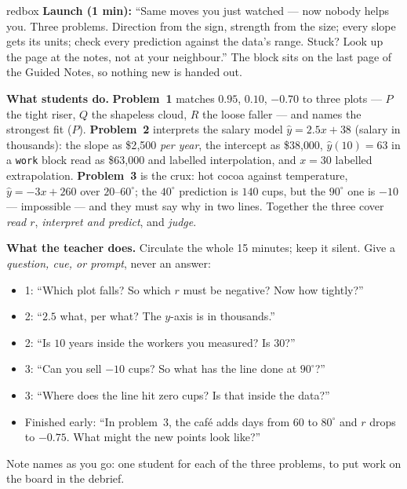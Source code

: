\documentclass[10pt]{article}
\begin{document}
\begin{skillbox}{redbox}
\textbf{Launch (1 min):} ``Same moves you just watched --- now nobody helps you. Three problems.
Direction from the sign, strength from the size; every slope gets its units; check every
prediction against the data's range. Stuck? Look up the page at the notes, not at your
neighbour.'' The block sits on the last page of the Guided Notes, so nothing new is handed out.
\begin{multicols}{2}
\textbf{What students do.} \textbf{Problem~1} matches $0.95$, $0.10$, $-0.70$ to three plots ---
$P$ the tight riser, $Q$ the shapeless cloud, $R$ the loose faller --- and names the strongest
fit ($P$). \textbf{Problem~2} interprets the salary model $\hat y=2.5x+38$ (salary in thousands):
the slope as \$2{,}500 \emph{per year}, the intercept as \$38{,}000, $\hat y(10)=63$ in a
\texttt{work} block read as \$63{,}000 and labelled interpolation, and $x=30$ labelled
extrapolation. \textbf{Problem~3} is the crux: hot cocoa against temperature,
$\hat y=-3x+260$ over $20$--$60^\circ$; the $40^\circ$ prediction is $140$ cups, but the
$90^\circ$ one is $-10$ --- impossible --- and they must say why in two lines. Together the three
cover \emph{read $r$}, \emph{interpret and predict}, and \emph{judge}.

\columnbreak
\textbf{What the teacher does.} Circulate the whole 15 minutes; keep it silent. Give a
\emph{question, cue, or prompt}, never an answer:
\begin{itemize}[leftmargin=1.1em, nosep]
  \item 1: ``Which plot falls? So which $r$ must be negative? Now how tightly?''
  \item 2: ``$2.5$ what, per what? The $y$-axis is in thousands.''
  \item 2: ``Is $10$ years inside the workers you measured? Is $30$?''
  \item 3: ``Can you sell $-10$ cups? So what has the line done at $90^\circ$?''
  \item 3: ``Where does the line hit zero cups? Is that inside the data?''
  \item Finished early: ``In problem~3, the caf\'e adds days from $60$ to $80^\circ$ and $r$
        drops to $-0.75$. What might the new points look like?''
\end{itemize}
Note names as you go: one student for each of the three problems, to put work on the board in the
debrief.
\end{multicols}
\end{skillbox}
\end{document}
